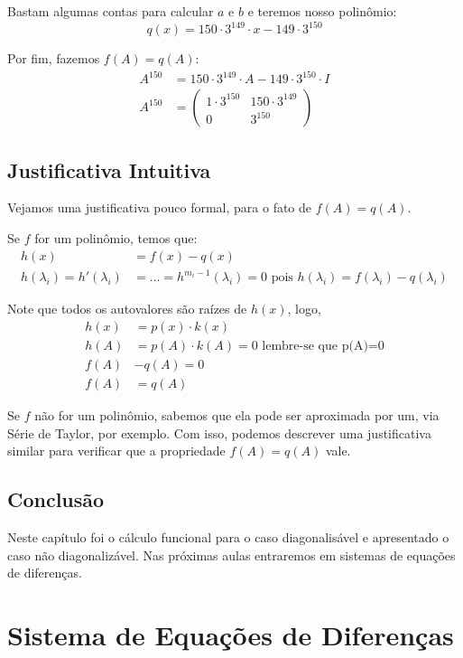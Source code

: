 \documentclass[12pt]{article}
\begin{document}
Bastam algumas contas para calcular $a$ e $b$ e teremos nosso polinômio:
\begin{equation*}
	q(x)=150\cdot 3^{149}\cdot x-149\cdot 3^{150}
\end{equation*}

Por fim, fazemos $f(A)=q(A)$:
\begin{align*}
	A^{150}&=150\cdot 3^{149}\cdot A-149\cdot 3^{150}\cdot I\\
	A^{150}&=\begin{pmatrix}
		1\cdot 3^{150}&150\cdot 3^{149}  \\
		0& 3^{150}
	\end{pmatrix}	
\end{align*}

\subsection{Justificativa Intuitiva}

Vejamos uma justificativa pouco formal, para o fato de $f(A)=q(A)$.

Se $f$ for um polinômio, temos que:
\begin{align*}
	h(x)&=f(x)-q(x)\\
	h(\lambda_i)=h'(\lambda_i)&=...=h^{m_i-1}(\lambda_i)=0 \mbox{ pois } h(\lambda_i)=f(\lambda_i)-q(\lambda_i)
\end{align*}

Note que todos os autovalores são raízes de $h(x)$, logo,
\begin{align*}
	h(x)&=p(x)\cdot k(x)\\
	h(A)&=p(A)\cdot k(A)=0 \mbox{ lembre-se que p(A)=0}\\
	f(A)&-q(A)=0\\
	f(A)&=q(A)
\end{align*}

Se $f$ não for um polinômio, sabemos que ela pode ser aproximada por um, via Série de Taylor, por exemplo. Com isso, podemos descrever uma justificativa similar para verificar que a propriedade $f(A)=q(A)$ vale.

\subsection{Conclusão}
Neste capítulo foi o cálculo funcional para o caso diagonalisável e apresentado o caso não diagonalizável. Nas próximas aulas entraremos em sistemas de equações de diferenças.


\section{Sistema de Equações de Diferenças}
\end{document}
